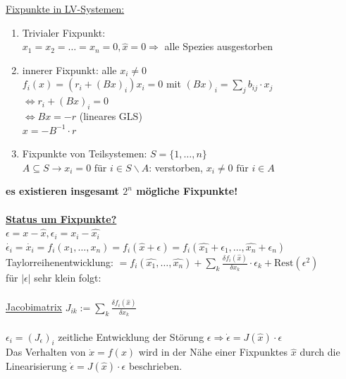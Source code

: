 \underline{Fixpunkte in LV-Systemen:}\\
\begin{enumerate}
	\item Trivialer Fixpunkt:\\
	$x_1=x_2=…=x_n=0, \hat{x}=0 \Rightarrow$ alle Spezies ausgestorben
	\item innerer Fixpunkt: alle $x_i\neq 0$\\
	$f_i(x)=(r_i + (Bx)_i)x_i=0$ mit $(Bx)_i=\sum_{j} b_{ij} \cdot x_j$\\
	$\Leftrightarrow r_i + (Bx)_i = 0$\\
	$\Leftrightarrow Bx=-r$ (lineares GLS)\\
	$x=-B^{-1} \cdot r$
	\item Fixpunkte von Teilsystemen: $S=\{1,…,n\}$\\
	$A \subseteq S \rightarrow x_i=0 \text{ für } i \in S\backslash A$: verstorben, $x_i \neq 0 \text{ für } i \in A$
\end{enumerate}

\textbf{es existieren insgesamt $2^n$ mögliche Fixpunkte!}\\\\

\underline{\textbf{Status um Fixpunkte?}}\\
$\epsilon=x-\hat{x}, \epsilon_i=x_i-\hat{x_i}$\\
$\dot{\epsilon_i}=\dot{x_i}=f_i(x_1,…,x_n)=f_i(\hat{x}+\epsilon)=f_i(\hat{x_1}+\epsilon_1, … , \hat{x_n}+\epsilon_n)$\\
Taylorreihenentwicklung: $=f_i(\hat{x_1}, … , \hat{x_n}) + \displaystyle  \sum_{k} \frac{\delta f_i(\hat{x})}{\delta x_k} \cdot \epsilon_k + \text{Rest}(\epsilon^2)$\\
für $|\epsilon|$ sehr klein folgt:\\\\
\underline{Jacobimatrix} $J_{ik}:=\displaystyle \sum_{k} \frac{\delta f_i(\hat{x})}{\delta x_k}$\\\\
$\epsilon_i=(J_{\epsilon})_i$ zeitliche Entwicklung der Störung $\epsilon \Rightarrow \dot{\epsilon}=J(\hat{x}) \cdot \epsilon$\\

Das Verhalten von $\dot{x} = f(x)$ wird in der Nähe einer Fixpunktes $\hat{x}$ durch die Linearisierung $\dot{\epsilon} = J(\hat{x}) \cdot \epsilon$ beschrieben.\\

